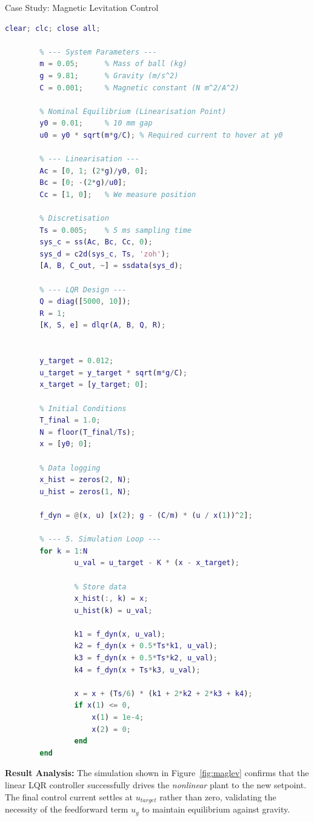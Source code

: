 \begin{examplebox}{Case Study: Magnetic Levitation Control}
	\begin{lstlisting}[language=Matlab, caption={LQR Setpoint Tracking for a MagLev System with RK4 Simulation.}, label=lst:maglev_tracking]
		clear; clc; close all;
		
		% --- System Parameters ---
		m = 0.05;      % Mass of ball (kg)
		g = 9.81;      % Gravity (m/s^2)
		C = 0.001;     % Magnetic constant (N m^2/A^2)
		
		% Nominal Equilibrium (Linearisation Point)
		y0 = 0.01;     % 10 mm gap
		u0 = y0 * sqrt(m*g/C); % Required current to hover at y0
		
		% --- Linearisation ---
		Ac = [0, 1; (2*g)/y0, 0]; 
		Bc = [0; -(2*g)/u0];
		Cc = [1, 0];   % We measure position
		
		% Discretisation
		Ts = 0.005;    % 5 ms sampling time
		sys_c = ss(Ac, Bc, Cc, 0);
		sys_d = c2d(sys_c, Ts, 'zoh');
		[A, B, C_out, ~] = ssdata(sys_d);
		
		% --- LQR Design ---
		Q = diag([5000, 10]); 
		R = 1;                
		[K, S, e] = dlqr(A, B, Q, R);
		

		y_target = 0.012; 		
		u_target = y_target * sqrt(m*g/C);
		x_target = [y_target; 0];
		
		% Initial Conditions
		T_final = 1.0;
		N = floor(T_final/Ts);
		x = [y0; 0];   
		
		% Data logging
		x_hist = zeros(2, N);
		u_hist = zeros(1, N);
		
		f_dyn = @(x, u) [x(2); g - (C/m) * (u / x(1))^2];
		
		% --- 5. Simulation Loop ---
		for k = 1:N
				u_val = u_target - K * (x - x_target);
		
				% Store data
				x_hist(:, k) = x;
				u_hist(k) = u_val;
		
				k1 = f_dyn(x, u_val);
				k2 = f_dyn(x + 0.5*Ts*k1, u_val);
				k3 = f_dyn(x + 0.5*Ts*k2, u_val);
				k4 = f_dyn(x + Ts*k3, u_val);
		
				x = x + (Ts/6) * (k1 + 2*k2 + 2*k3 + k4);
				if x(1) <= 0, 
					x(1) = 1e-4; 
					x(2) = 0; 
				end
		end
	\end{lstlisting}
	
	\textbf{Result Analysis:}
	The simulation shown in Figure~\ref{fig:maglev} confirms that the linear LQR controller successfully drives the \textit{nonlinear} plant to the new setpoint. The final control current settles at $u_{target}$ rather than zero, validating the necessity of the feedforward term $u_g$ to maintain equilibrium against gravity.
	

\end{examplebox}
